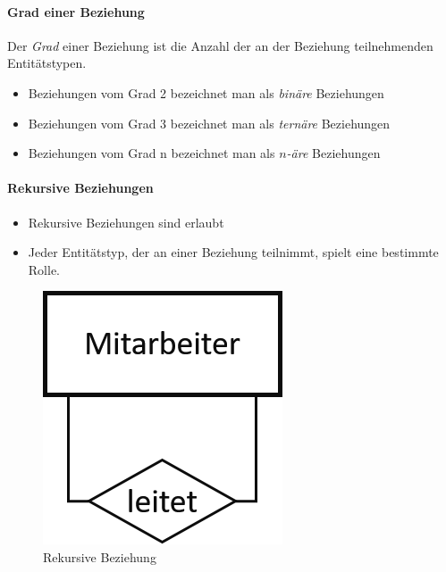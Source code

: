 \begin{frame}{\insertsection}
\framesubtitle{Grad einer Beziehung}
\begin{definition}
	\label{def:gradVonBeziehungen}
	Der \textit{Grad} einer Beziehung ist die Anzahl der an der Beziehung teilnehmenden Entit\"atstypen.
\end{definition}
\begin{itemize}
	\item Beziehungen vom Grad 2 bezeichnet man als \textit{binäre} Beziehungen
	\item Beziehungen vom Grad 3 bezeichnet man als \textit{ternäre} Beziehungen
	\item Beziehungen vom Grad n bezeichnet man als $n$\textit{-äre} Beziehungen
\end{itemize}
\end{frame}

\begin{frame}[t]{\insertsection}
\framesubtitle{Rekursive Beziehungen}
\begin{itemize}
\item Rekursive Beziehungen sind erlaubt
\item Jeder Entitätstyp, der an einer Beziehung teilnimmt, spielt eine bestimmte Rolle.
\end{itemize}
\begin{figure}
	\includegraphics[scale=0.5]{img/ERM-Rekursiv.png}	
   \caption{Rekursive Beziehung}
\end{figure}		
\end{frame}

